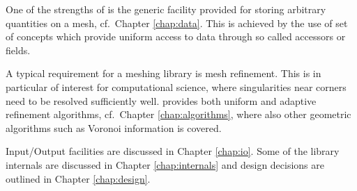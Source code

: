 One of the strengths of {\ViennaGrid} is the generic facility provided for storing arbitrary quantities on a mesh, cf.~Chapter \ref{chap:data}. This is achieved by the use of set of concepts which provide uniform access to data through so called accessors or fields.

A typical requirement for a meshing library is mesh refinement. This is in particular of interest for computational science, where singularities near corners need to be resolved sufficiently well. {\ViennaGrid} provides both uniform and adaptive refinement algorithms, cf.~Chapter \ref{chap:algorithms}, where also other geometric algorithms such as Voronoi information is covered.

Input/Output facilities are discussed in Chapter \ref{chap:io}. Some of the library internals are discussed in Chapter \ref{chap:internals} and design decisions are outlined in Chapter \ref{chap:design}.

